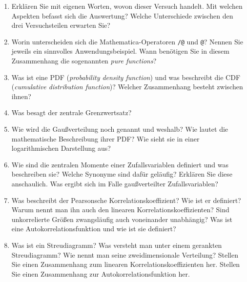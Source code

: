 \documentclass[a4paper,10pt]{article}
\begin{document}
\begin{enumerate}
 \item Erklären Sie mit eigenen Worten, wovon dieser Versuch handelt.
 \subitem Mit welchen Aspekten befasst sich die Auswertung?
 \subitem Welche Unterschiede zwischen den drei Versuchsteilen erwarten Sie?
 \item Worin unterscheiden sich die Mathematica-Operatoren \texttt{/@} und \texttt{@}?
 \subitem Nennen Sie jeweils ein sinnvolles Anwendungsbeispiel.
 \subitem Wann benötigen Sie in diesem Zusammenhang die sogenannten \textit{pure functions}?
 \item Was ist eine PDF (\textit{probability density function}) und was beschreibt die CDF (\textit{cumulative distribution function})? Welcher Zusammenhang besteht zwischen ihnen?
 \item Was besagt der zentrale Grenzwertsatz?
 \item Wie wird die Gaußverteilung noch genannt und weshalb?
 \subitem Wie lautet die mathematische Beschreibung ihrer PDF?
 \subitem Wie sieht sie in einer logarithmischen Darstellung aus?
 \item Wie sind die zentralen Momente einer Zufallsvariablen definiert und was beschreiben sie?
 \subitem Welche Synonyme sind dafür geläufig? Erklären Sie diese anschaulich.
 \subitem Was ergibt sich im Falle gaußverteilter Zufallsvariablen?
 \item Was beschreibt der Pearsonsche Korrelationskoeffizient?
 \subitem Wie ist er definiert?
 \subitem Warum nennt man ihn auch den linearen Korrelationskoeffizienten?
 \subitem Sind unkorrelierte Größen zwangsläufig auch voneinander unabhängig?
 \subitem Was ist eine Autokorrelationsfunktion und wie ist sie definiert?
 \item Was ist ein Streudiagramm?
 \subitem Was versteht man unter einem gerankten Streudiagramm?
 \subitem Wie nennt man seine zweidimensionale Verteilung?
 \subitem * Stellen Sie einen Zusammenhang zum linearen Korrelationskoeffizienten her.
 \subitem * Stellen Sie einen Zusammenhang zur Autokorrelationsfunktion her.
\end{enumerate}
\end{document}
